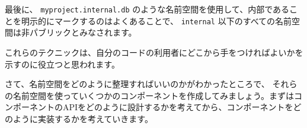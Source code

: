 最後に、 \texttt{myproject.internal.db} のような名前空間を使用して、内部であることを明示的にマークするのはよくあることで、 \texttt{internal} 以下のすべての名前空間は非パブリックとみなされます。

これらのテクニックは、自分のコードの利用者にどこから手をつければよいかを示すのに役立つと思われます。

さて、名前空間をどのように整理すればいいのかがわかったところで、 それらの名前空間を使っていくつかのコンポーネントを作成してみましょう。まずはコンポーネントのAPIをどのように設計するかを考えてから、コンポーネントをどのように実装するかを考えていきます。






